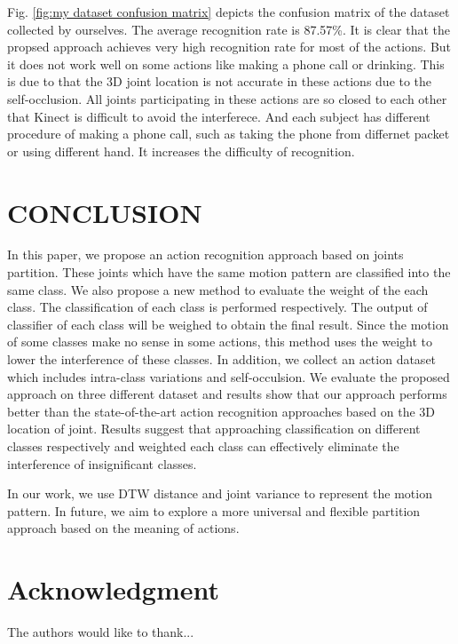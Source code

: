 \documentclass[conference]{IEEEtran}
\begin{document}
			Fig. \ref{fig:my dataset confusion matrix} depicts the confusion matrix of the dataset collected by ourselves.
			The average recognition rate is 87.57\%.
			It is clear that the propsed approach achieves very high recognition rate for most of the actions.
			But it does not work well on some actions like making a phone call or drinking.
			This is due to that the 3D joint location is not accurate in these actions due to the self-occlusion.
			All joints participating in these actions are so closed to each other that Kinect is difficult to avoid the interferece.
			And each subject has different procedure of making a phone call, such as taking the phone from differnet packet or using different hand.
			It increases the difficulty of recognition.
			
\section{CONCLUSION}
\label{sec:CONCLUSION}
	In this paper, we propose an action recognition approach based on joints partition.
	These joints which have the same motion pattern are classified into the same class.
	We also propose a new method to evaluate the weight of the each class.
	The classification of each class is performed respectively.
	The output of classifier of each class will be weighed to obtain the final result.
	Since the motion of some classes make no sense in some actions, this method uses the weight to lower the interference of these classes.
	In addition, we collect an action dataset which includes intra-class variations and self-occulsion.
	We evaluate the proposed approach on three different dataset and results show that our approach performs better than the state-of-the-art action recognition approaches based on the 3D location of joint.
	Results suggest that approaching classification on different classes respectively and weighted each class can effectively eliminate the interference of insignificant classes.
	
	In our work, we use DTW distance and joint variance to represent the motion pattern.
	In future, we aim to explore a more universal and flexible partition approach based on the meaning of actions.
	
\section*{Acknowledgment}
The authors would like to thank...
\end{document}

